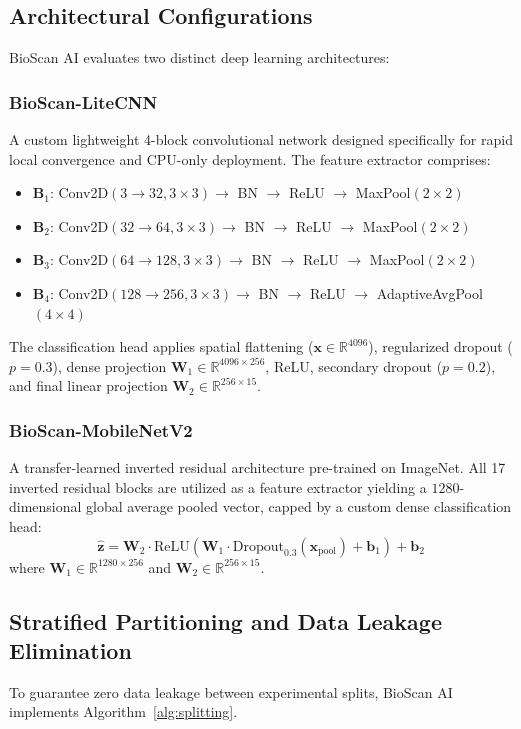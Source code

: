 \documentclass[11pt,a4paper]{article}
\begin{document}
\subsection{Architectural Configurations}
BioScan AI evaluates two distinct deep learning architectures:

\subsubsection{BioScan-LiteCNN}
A custom lightweight 4-block convolutional network designed specifically for rapid local convergence and CPU-only deployment. The feature extractor comprises:
\begin{itemize}
    \item $\mathbf{B}_1$: Conv2D$(3 \to 32, 3 \times 3) \to$ BN $\to$ ReLU $\to$ MaxPool$(2 \times 2)$
    \item $\mathbf{B}_2$: Conv2D$(32 \to 64, 3 \times 3) \to$ BN $\to$ ReLU $\to$ MaxPool$(2 \times 2)$
    \item $\mathbf{B}_3$: Conv2D$(64 \to 128, 3 \times 3) \to$ BN $\to$ ReLU $\to$ MaxPool$(2 \times 2)$
    \item $\mathbf{B}_4$: Conv2D$(128 \to 256, 3 \times 3) \to$ BN $\to$ ReLU $\to$ AdaptiveAvgPool$(4 \times 4)$
\end{itemize}
The classification head applies spatial flattening ($\mathbf{x} \in \mathbb{R}^{4096}$), regularized dropout ($p=0.3$), dense projection $\mathbf{W}_1 \in \mathbb{R}^{4096 \times 256}$, $\text{ReLU}$, secondary dropout ($p=0.2$), and final linear projection $\mathbf{W}_2 \in \mathbb{R}^{256 \times 15}$.

\subsubsection{BioScan-MobileNetV2}
A transfer-learned inverted residual architecture pre-trained on ImageNet. All 17 inverted residual blocks are utilized as a feature extractor yielding a $1280$-dimensional global average pooled vector, capped by a custom dense classification head:
\begin{equation}
\hat{\mathbf{z}} = \mathbf{W}_2 \cdot \text{ReLU}\left(\mathbf{W}_1 \cdot \text{Dropout}_{0.3}(\mathbf{x}_{\text{pool}}) + \mathbf{b}_1\right) + \mathbf{b}_2
\end{equation}
where $\mathbf{W}_1 \in \mathbb{R}^{1280 \times 256}$ and $\mathbf{W}_2 \in \mathbb{R}^{256 \times 15}$.

\subsection{Stratified Partitioning and Data Leakage Elimination}
To guarantee zero data leakage between experimental splits, BioScan AI implements Algorithm~\ref{alg:splitting}.
\end{document}
